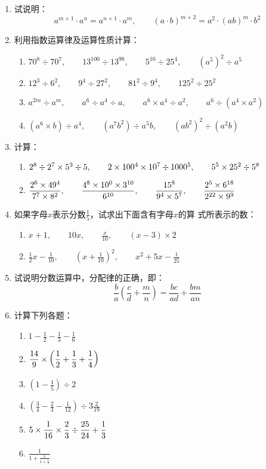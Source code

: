 \begin{enumerate}
\item 试说明： $$a^{m+1} \cdot a^{n}=a^{n+1} \cdot a^{m},\qquad 
(a \cdot b)^{m+2}=a^{2} \cdot(a b)^{m} \cdot b^{2}
$$
\item 
利用指数运算律及运算性质计算：
\begin{enumerate}
    \item $70^{8}\div 70^{7},\qquad 13^{100}\div 13^{98},\qquad 5^{10}\div 25^{4}, \qquad \left(a^{5}\right)^{2}\div a^{5}$
    \item $12^{3}\div 6^{2},\qquad 9^{4}\div 27^{2} ,\qquad 81^{2}\div 9^{4} ,\qquad 125^{2}\div 25^{2}$
    \item $a^{2 m} \div a^{m},\qquad a^{6}\div a^{4} \div a ,\qquad a^{6} \times a^{4} \div a^{2},\qquad a^{6}\div\left(a^{4} \times a^{2}\right)$
    \item $\left(a^{6} \times b\right)\div a^{4},\qquad \left(a^{7} b^{2}\right)\div a^{5} b ,\qquad \left(a b^{2}\right)^{2}\div \left(a^{2} b\right)$
\end{enumerate}

\item 计算：
\begin{enumerate}
    \item $2^8\div 2^7\times 5^3\div 5,\qquad 2\times 100^4\times 10^7\div 1000^5,\qquad 5^5\times 25^2\div 5^8$
    \item $\dfrac{2^6\times 49^4}{7^7\times 8^2},\qquad \dfrac{4^8\times 10^0\times 3^{10}}{6^{10}},\qquad \dfrac{15^8}{9^4\times 5^7},\qquad \dfrac{2^5\times 6^{18}}{2^{22}\times 9^9}$
\end{enumerate}

\item 如果字母$x$表示分数$\frac{1}{5}$，试求出下面含有字母$x$的算
式所表示的数：
\begin{enumerate}
    \item $x+1,\qquad 10x,\qquad \frac{x}{10},\qquad (x-3)\times 2$
    \item $\frac{1}{2}x-\frac{1}{10},\qquad \left(x+\frac{1}{10}\right)^2,\qquad x^2+5x-\frac{1}{25}$
\end{enumerate}

\item 试说明分数运算中，分配律的正确，即：
\[\frac{b}{a}\left(\frac{c}{d}+\frac{m}{n}\right)=\frac{bc}{ad}+\frac{bm}{an} \]

\item 计算下列各题：
    \begin{multicols}{2}
\begin{enumerate}
    \item $1-\frac{1}{2}-\frac{1}{3}-\frac{1}{6}$
    \item $\dfrac{14}{9}\times\left(\dfrac{1}{2}+\dfrac{1}{3}+\dfrac{1}{4}\right)$
    \item $\left(1-\frac{1}{5}\right)\div 2$
    \item $\left(\frac{3}{4}-\frac{2}{3}-\frac{1}{12}\right)\div 3\frac{2}{19}$
    \item $5\times \dfrac{1}{16}\times \dfrac{2}{3}\div \dfrac{25}{24}+\dfrac{1}{3}$
    \item $\frac{1}{1+\frac{1}{1+\frac{1}{2}}}$
\end{enumerate}
\end{multicols}


\end{enumerate}
